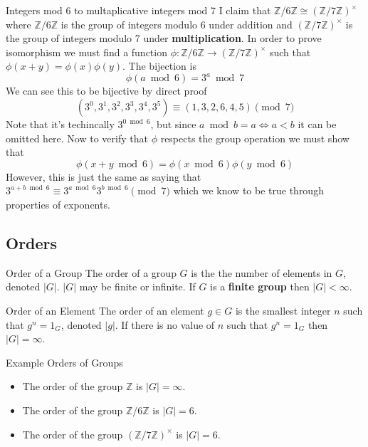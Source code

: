 \begin{example}{Integers mod 6 to multaplicative integers mod 7}{} I claim that $\mathbb{Z}/6\mathbb{Z} \cong (\mathbb{Z}/7\mathbb{Z})^{\times}$ where $\mathbb{Z}/6\mathbb{Z}$ is the group of integers modulo 6 under addition and $(\mathbb{Z}/7\mathbb{Z})^{\times}$ is the group of integers modulo 7 under \textbf{multiplication}. In order to prove isomorphism we must find a function $\phi: \mathbb{Z}/6\mathbb{Z} \to (\mathbb{Z}/7\mathbb{Z})^{\times}$ such that $\phi(x + y) = \phi(x)\phi(y)$. The bijection is
	\begin{equation*}
		\phi(a \bmod 6) = 3^{a} \bmod{7}
	\end{equation*}
	We can see this to be bijective by direct proof
	\begin{equation*}
		(3^0, 3^1, 3^2, 3^3, 3^4, 3^5) \equiv (1, 3, 2, 6, 4, 5) \pmod{7}
	\end{equation*}
	Note that it's techincally $3^{0 \bmod 6}$, but since $a \bmod b = a \Leftrightarrow a < b$ it can be omitted here. Now to verify that $\phi$ respects the group operation we must show that
	\begin{equation*}
		\phi(x+y \bmod 6) = \phi(x\bmod 6)\phi(y\bmod 6)
	\end{equation*}
	However, this is just the same as saying that $\displaystyle 3^{a+b\bmod 6} \equiv 3^{a \bmod 6}3^{b \bmod 6} \pmod{7}$ which we know to be true through properties of exponents.
\end{example}

\subsection{Orders}
\begin{definition}{Order of a Group}{} The order of a group $G$ is the the number of elements in $G$, denoted $|G|$. $|G|$ may be finite or infinite. If $G$ is a \textbf{finite group} then $|G| < \infty$.
\end{definition}
\begin{definition}{Order of an Element}{} The order of an element $g \in G$ is the smallest integer $n$ such that $g^{n} = 1_G$, denoted $|g|$. If there is no value of $n$ such that $g^{n} = 1_{G}$ then $|G|=\infty$.
\end{definition}

\begin{example}{Example Orders of Groups}{}
    \begin{itemize}
        \item The order of the group $\mathbb{Z}$ is $|G| = \infty$.
        \item The order of the group $\mathbb{Z}/6\mathbb{Z}$ is $|G| = 6$.
        \item The order of the group $(\mathbb{Z}/7\mathbb{Z})^{\times}$ is $|G| = 6$.
    \end{itemize}
\end{example}
